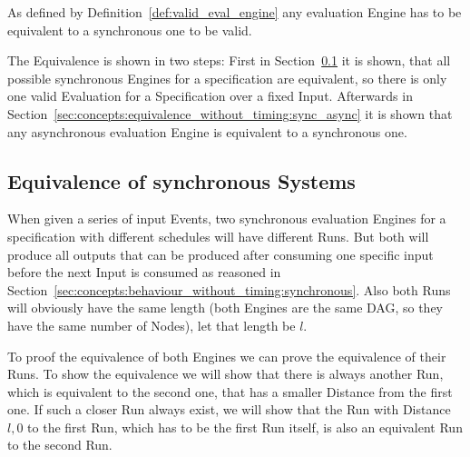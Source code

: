 As defined by Definition~\ref{def:valid_eval_engine} any evaluation Engine has to be equivalent to a synchronous one to be valid.

The Equivalence is shown in two steps: First in Section~\ref{sec:concepts:equivalence_without_timing:synchronous} it is shown, that all possible synchronous Engines for a specification are equivalent, so there is only one valid Evaluation for a Specification over a fixed Input.
Afterwards in Section~\ref{sec:concepts:equivalence_without_timing:sync_async} it is shown that any asynchronous evaluation Engine is equivalent to a synchronous one.


\subsection{Equivalence of synchronous Systems}
\label{sec:concepts:equivalence_without_timing:synchronous}

When given a series of input Events, two synchronous evaluation Engines for a specification with different schedules will have different Runs.
But both will produce all outputs that can be produced after consuming one specific input before the next Input is consumed as reasoned in Section~\ref{sec:concepts:behaviour_without_timing:synchronous}.
Also both Runs will obviously have the same length (both Engines are the same DAG, so they have the same number of Nodes), let that length be \(l\).

To proof the equivalence of both Engines we can prove the equivalence of their Runs.
To show the equivalence we will show that there is always another Run, which is equivalent to the second one, that has a smaller Distance from the first one.
If such a closer Run always exist, we will show that the Run with Distance \(l, 0\) to the first Run, which has to be the first Run itself, is also an equivalent Run to the second Run.


